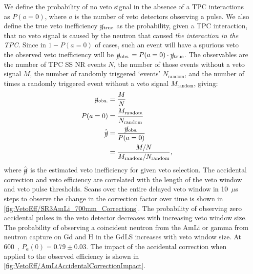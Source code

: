 We define the probability of no veto signal in the absence of a TPC interactions as $P(a=0)$, where $a$ is the number of veto detectors observing a pulse. We also define the true veto inefficiency $\cancel\eta_\text{true}$ as the probability, given a TPC interaction, that no veto signal is caused by the neutron that caused \emph{the interaction in the TPC}. Since in $1-P(a=0)$ of cases, such an event will have a spurious veto the observed veto inefficiency will be $\cancel\eta_\text{obs.}=P(a=0)\cdot\cancel\eta_\text{true}$. The observables are the number of TPC SS NR events $N$, the number of those events without a veto signal $M$, the number of randomly triggered `events' $N_\text{random}$, and the number of times a randomly triggered event without a veto signal $M_\text{random}$, giving:
\begin{align}
    \cancel\eta_\text{obs.}&=\frac{M}{N}\\
    P(a=0)&=\frac{M_\text{random}}{N_\text{random}}\\
    \hat{\cancel\eta}&=\frac{\cancel\eta_\text{obs.}}{P(a=0)}\\
    &=\frac{M/N}{M_\text{random}/N_\text{random}},
\end{align}
where $\hat{\cancel\eta}$ is the estimated veto inefficiency for given veto selection. The accidental correction and veto efficiency are correlated with the length of the veto window and veto pulse thresholds. Scans over the entire delayed veto window in 10~$\mu$s steps to observe the change in the correction factor over time is shown in \autoref{fig:VetoEff/SR3AmLi_700mm_Corrections}. The probability of observing zero accidental pulses in the veto detector decreases with increasing veto window size. The probability of observing a coincident neutron from the AmLi or gamma from neutron capture on Gd and H in the GdLS increases with veto window size. At 600~\textmu{}, $P_a(0)=0.79\pm0.03$.
The impact of the accidental correction when applied to the observed efficiency is shown in \autoref{fig:VetoEff/AmLiAccidentalCorrectionImpact}.


